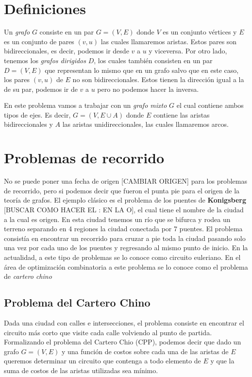 \section{Definiciones}

Un \textit{grafo} $G$ consiste en un par $G = (V,E)$ donde $V$ es un conjunto vértices y $E$ es un conjunto de pares $(v,u)$ las cuales llamaremos aristas. Estos pares son bidireccionales, es decir, podemos ir desde $v$ a $u$ y viceversa. Por otro lado, tenemos los \textit{grafos dirigidos} $D$, los cuales también consisten en un par $D = (V,E)$ que representan lo mismo que en un grafo salvo que en este caso, los pares $(v,u)$ de $E$ no son bidireccionales. Estos tienen la dirección igual a la de su par, podemos ir de $v$ a $u$ pero no podemos hacer la inversa.

\vspace{3mm}

En este problema vamos a trabajar con un \textit{grafo mixto} $G$ el cual contiene ambos tipos de ejes. Es decir, $G = (V, E\cup A)$ donde $E$ contiene las aristas bidireccionales y $A$ las aristas unidireccionales, las cuales llamaremos arcos.

\section{Problemas de recorrido}

No se puede poner una fecha de origen [CAMBIAR ORIGEN] para los problemas de recorrido, pero si podemos decir que fueron el punta pie para el origen de la teoría de grafos. El ejemplo clásico es el problema de los puentes de \textbf{Konigsberg} [BUSCAR COMO HACER EL : EN LA O], el cual tiene el nombre de la ciudad a la cual es origen. En esta ciudad tenemos un río que se bifurca y rodea un terreno separando en 4 regiones la ciudad conectada por 7 puentes. El problema consistía en encontrar un recorrido para cruzar a pie toda la ciudad pasando solo una vez por cada uno de los puentes y regresando al mismo punto de inicio. En la actualidad, a este tipo de problemas se lo conoce como circuito euleriano. En el área de optimización combinatoria a este problema se lo conoce como el problema de \textit{cartero chino}

\subsection{Problema del Cartero Chino}

Dada una ciudad con calles e intersecciones, el problema consiste en encontrar el circuito más corto que visite cada calle volviendo al punto de partida. Formalizando el problema del Cartero Chio (CPP), podemos decir que dado un grafo $G = (V,E)$ y una función de costos sobre cada una de las aristas de $E$ queremos determinar un circuito que contenga a todo elemento de $E$ y que la suma de costos de las aristas utilizadas sea mínimo.

